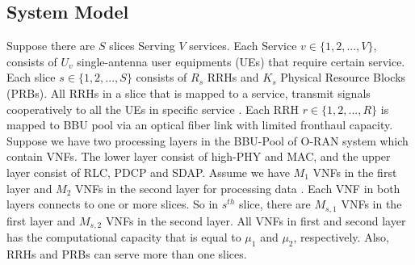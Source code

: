 \documentclass[conference]{IEEEtran}
\begin{document}
\subsection{System Model}
Suppose there are $S$ slices Serving $V$ services. Each Service $v\in \{1,2,...,V \} $, consists of $U_v$ single-antenna user equipments (UEs) that require certain service. Each slice $s \in \{1,2,...,S \}$ consists of $R_s$ RRHs and $K_s$ Physical Resource Blocks (PRBs). All RRHs in a slice that is mapped to a service, transmit signals cooperatively to all the UEs in specific service \cite{motalleb2017optimal,mimoCran}. Each RRH $r \in \{1,2,...,R \}$ is mapped to BBU pool via an optical fiber link with limited fronthaul capacity.
Suppose we have two processing layers in the BBU-Pool of O-RAN system which contain VNFs. The lower layer consist of high-PHY and MAC, and the upper layer consist of RLC, PDCP and SDAP.
Assume we have $M_1$ VNFs in the first layer and $M_2$ VNFs in the second layer for processing data .
Each VNF in both layers connects to one or more slices. So in $s^{th}$ slice, there are $M_{s,1}$ VNFs in the first layer and $M_{s,2}$ VNFs in the second layer. All VNFs in first and second layer has the computational capacity that is  equal to $\mu_1$ and $\mu_2$, respectively. 
Also, RRHs and PRBs can serve more than one slices. 
\end{document}
